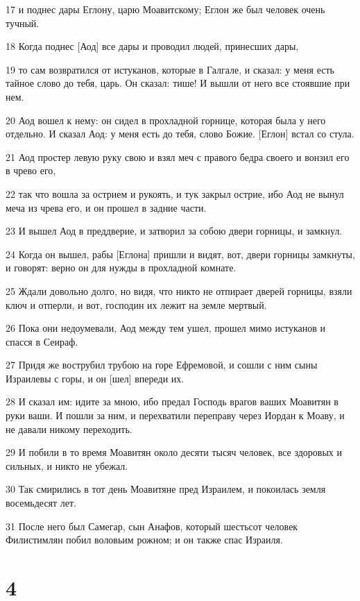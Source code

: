 \par 17 и поднес дары Еглону, царю Моавитскому; Еглон же был человек очень тучный.
\par 18 Когда поднес [Аод] все дары и проводил людей, принесших дары,
\par 19 то сам возвратился от истуканов, которые в Галгале, и сказал: у меня есть тайное слово до тебя, царь. Он сказал: тише! И вышли от него все стоявшие при нем.
\par 20 Аод вошел к нему: он сидел в прохладной горнице, которая была у него отдельно. И сказал Аод: у меня есть до тебя, слово Божие. [Еглон] встал со стула.
\par 21 Аод простер левую руку свою и взял меч с правого бедра своего и вонзил его в чрево его,
\par 22 так что вошла за острием и рукоять, и тук закрыл острие, ибо Аод не вынул меча из чрева его, и он прошел в задние части.
\par 23 И вышел Аод в преддверие, и затворил за собою двери горницы, и замкнул.
\par 24 Когда он вышел, рабы [Еглона] пришли и видят, вот, двери горницы замкнуты, и говорят: верно он для нужды в прохладной комнате.
\par 25 Ждали довольно долго, но видя, что никто не отпирает дверей горницы, взяли ключ и отперли, и вот, господин их лежит на земле мертвый.
\par 26 Пока они недоумевали, Аод между тем ушел, прошел мимо истуканов и спасся в Сеираф.
\par 27 Придя же вострубил трубою на горе Ефремовой, и сошли с ним сыны Израилевы с горы, и он [шел] впереди их.
\par 28 И сказал им: идите за мною, ибо предал Господь врагов ваших Моавитян в руки ваши. И пошли за ним, и перехватили переправу через Иордан к Моаву, и не давали никому переходить.
\par 29 И побили в то время Моавитян около десяти тысяч человек, все здоровых и сильных, и никто не убежал.
\par 30 Так смирились в тот день Моавитяне пред Израилем, и покоилась земля восемьдесят лет.
\par 31 После него был Самегар, сын Анафов, который шестьсот человек Филистимлян побил воловьим рожном; и он также спас Израиля.

\chapter{4}

